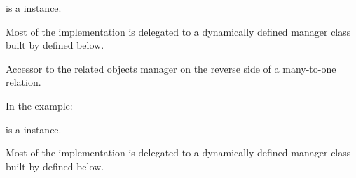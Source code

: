 \documentclass[letterpaper,10pt,english]{sphinxmanual}
\begin{document}
\begin{fulllineitems}
\begin{fulllineitems}
 is a  instance.

Most of the implementation is delegated to a dynamically defined manager
class built by  defined below.

\end{fulllineitems}


\begin{fulllineitems}
\label{\detokenize{modules/models:preferences.models.PaymentMethod.cotisationhistory_set}}
Accessor to the related objects manager on the reverse side of a
many-to-one relation.

In the example:

\begin{sphinxVerbatim}[commandchars=\\\{\}]
 
       
\end{sphinxVerbatim}

 is a  instance.

Most of the implementation is delegated to a dynamically defined manager
class built by  defined below.

\end{fulllineitems}


\begin{fulllineitems}
\label{\detokenize{modules/models:preferences.models.PaymentMethod.history}}
\end{fulllineitems}


\end{fulllineitems}
\end{document}
